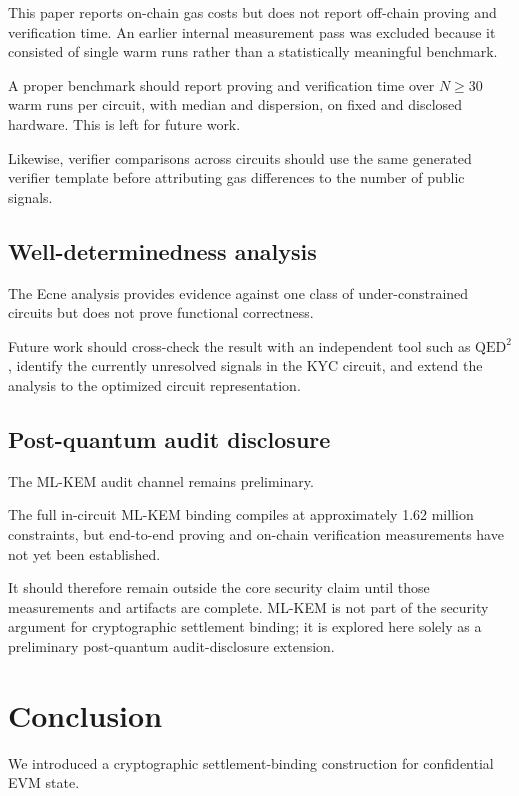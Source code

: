 \documentclass[10pt,twocolumn]{article}
\begin{document}
This paper reports on-chain gas costs but does not report off-chain
proving and verification time. An earlier internal measurement pass was
excluded because it consisted of single warm runs rather than a
statistically meaningful benchmark.

A proper benchmark should report proving and verification time over
$N \geq 30$ warm runs per circuit, with median and dispersion, on fixed
and disclosed hardware. This is left for future work.

Likewise, verifier comparisons across circuits should use the same
generated verifier template before attributing gas differences to the
number of public signals.

\subsection{Well-determinedness analysis}

The Ecne analysis provides evidence against one class of
under-constrained circuits but does not prove functional correctness.

Future work should cross-check the result with an independent tool such
as $\mathrm{QED}^2$ \cite{qed2}, identify the currently unresolved
signals in the KYC circuit, and extend the analysis to the optimized
circuit representation.

\subsection{Post-quantum audit disclosure}

The ML-KEM \cite{mlkem} audit channel remains preliminary.

The full in-circuit ML-KEM binding compiles at approximately 1.62
million constraints, but end-to-end proving and on-chain verification
measurements have not yet been established.

It should therefore remain outside the core security claim until those
measurements and artifacts are complete. ML-KEM is not part of the
security argument for cryptographic settlement binding; it is explored
here solely as a preliminary post-quantum audit-disclosure extension.

\section{Conclusion}

We introduced a cryptographic settlement-binding construction for
confidential EVM state.
\end{document}
